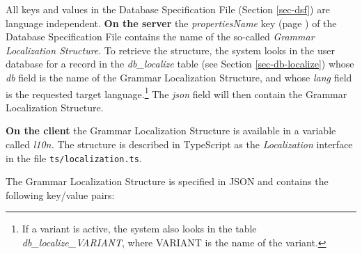 \documentclass[11pt,oneside,a4paper]{memoir}
\begin{document}
All keys and values in the Database Specification File (Section \ref{sec-dsf}) are language
independent. \textbf{On the server} the \emph{propertiesName} key (page \pageref{propname}) of the
Database Specification File contains the name of the so-called \emph{Grammar Localization
  Structure}. To retrieve the structure, the system looks in the user database for a record in the
\emph{db\_localize} table (see Section \ref{sec-db-localize}) whose \emph{db} field is the name of
the Grammar Localization Structure, and whose \emph{lang} field is the requested target
language.\footnote{If a variant is active, the system also looks in the table
  \emph{db\_localize\_VARIANT}, where VARIANT is the name of the variant.}
The \emph{json} field will then contain the Grammar Localization Structure.

\textbf{On the client} the Grammar Localization Structure is available in a
variable called \emph{l10n.}%
The structure is described in TypeScript as the \emph{Localization} interface%
 in the file \texttt{ts/localization.ts}.

The Grammar Localization Structure is specified in JSON and contains the following key/value pairs:
\end{document}
